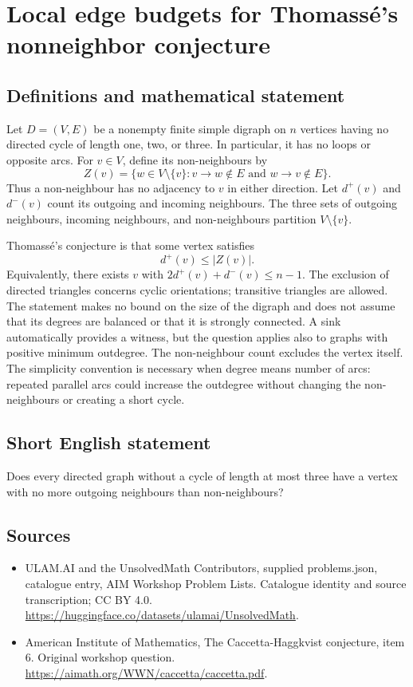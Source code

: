 \documentclass[11pt,a4paper]{article}
\begin{document}
\section*{Local edge budgets for Thomassé's nonneighbor conjecture}\label{statement}

\subsection{Definitions and mathematical statement}
Let $D=(V,E)$ be a nonempty finite simple digraph on $n$ vertices
having no directed cycle of length one, two, or three. In particular,
it has no loops or opposite arcs. For $v\in V$, define its non-neighbours
by
\[
 Z(v)=\{w\in V\setminus\{v\}:v\to w\notin E
                                      \text{ and }w\to v\notin E\}.
\]
Thus a non-neighbour has no adjacency to $v$ in either direction.
Let $d^+(v)$ and $d^-(v)$ count its outgoing and incoming neighbours.
The three sets of outgoing neighbours, incoming neighbours, and
non-neighbours partition $V\setminus\{v\}$.

Thomass\'e's conjecture is that some vertex satisfies
\[
                             d^+(v)\le |Z(v)|.
\]
Equivalently, there exists $v$ with
$2d^+(v)+d^-(v)\le n-1$.
The exclusion of directed triangles concerns cyclic orientations;
transitive triangles are allowed. The statement makes no bound on
the size of the digraph and does not assume that its degrees are
balanced or that it is strongly connected.
A sink automatically provides a witness, but the question applies
also to graphs with positive minimum outdegree. The non-neighbour
count excludes the vertex itself. The simplicity convention is
necessary when degree means number of arcs: repeated parallel arcs
could increase the outdegree without changing the non-neighbours or
creating a short cycle.
\subsection{Short English statement}
Does every directed graph without a cycle of length at most three have a vertex with no more outgoing neighbours than non-neighbours?
\subsection{Sources}
\begin{itemize}
\item[S1] ULAM.AI and the UnsolvedMath Contributors, supplied problems.json, catalogue entry, AIM Workshop Problem Lists. Catalogue identity and source transcription; CC BY 4.0.
\url{https://huggingface.co/datasets/ulamai/UnsolvedMath}.
\item[S2] American Institute of Mathematics, The Caccetta-Haggkvist conjecture, item 6. Original workshop question.
\url{https://aimath.org/WWN/caccetta/caccetta.pdf}.
\end{itemize}
\end{document}
